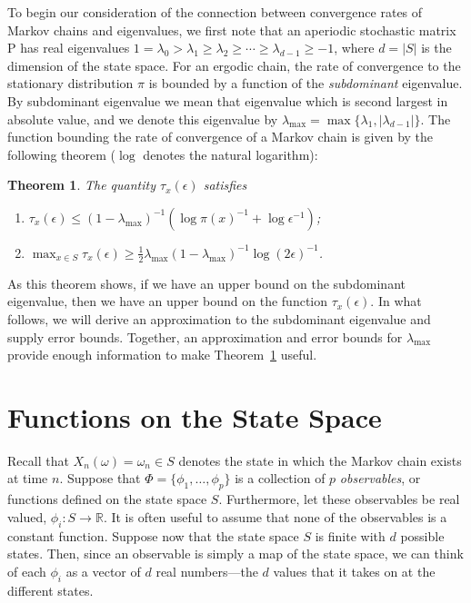 \documentclass[12pt,letterpaper]{report}
\theoremstyle{plain}
\newtheorem{theorem}{Theorem}[chapter]
\theoremstyle{definition}
\theoremstyle{remark}
\numberwithin{theorem}{chapter}
\numberwithin{claim}{chapter}
\numberwithin{equation}{chapter}
\numberwithin{conjecture}{chapter}
\newcommand\R{\ensuremath{\mathbb{R}}}
\renewcommand\P{\ensuremath{\mathrm{P}}}
\newcommand\<{\ensuremath{\langle}}
\renewcommand\>{\ensuremath{\rangle}}
\begin{document}
To begin our consideration of the connection between convergence rates of Markov
chains and eigenvalues, we first note that an aperiodic stochastic matrix $\P$ has real
eigenvalues 
$1 = \lambda_0 > \lambda_1 \geq \lambda_2 \geq \cdots \geq \lambda_{d-1} \geq -1$, 
where $d = |S|$ is the dimension of the state space. For an ergodic chain, the
rate of convergence to the stationary distribution $\pi$ is bounded by a
function of the \emph{subdominant} eigenvalue. By subdominant eigenvalue we mean that
eigenvalue which is second largest in absolute value, and we denote this
eigenvalue by $\lambda_{\max} = \max\{\lambda_1, |\lambda_{d-1}|\}$. 
The function bounding the rate of convergence of a Markov chain is given by the
following theorem ($\log$ denotes the natural logarithm):
\begin{theorem}
\label{thm-2.1.2}
The quantity $\tau_x(\epsilon)$ satisfies
\begin{enumerate}
\item 
$\tau_x(\epsilon) \leq (1-\lambda_{\max})^{-1}(\log \pi(x)^{-1} + \log \epsilon^{-1})$;
\item $\max_{x \in S} \tau_x(\epsilon) \geq \frac{1}{2} \lambda_{\max}(1-\lambda_{\max})^{-1} \log(2\epsilon)^{-1}$.
\end{enumerate}
\end{theorem}
As this theorem shows, if we have an upper bound on the subdominant eigenvalue, then we have
an upper bound on the function $\tau_x(\epsilon)$. In what follows, we will
derive an approximation to the 
subdominant eigenvalue and supply error bounds. Together, an approximation and error bounds
for $\lambda_{\max}$  provide enough information to make Theorem~\ref{thm-2.1.2} useful.

\section{Functions on the State Space}
\label{sec:funct-state-space}
Recall that $X_n(\omega) = \omega_n\in S$ denotes the state in which the Markov
chain exists at time $n$. 
Suppose that 
$\Phi = \{\phi_1, \dots, \phi_p\}$ 
is a collection of $p$ \emph{observables}, or functions defined on the state
space $S$. Furthermore, let these observables be real valued, 
$\phi_i : S \rightarrow \R$. 
It is often useful to assume that none of the observables is a constant function. Suppose now that
the state space $S$ is finite with $d$ possible states. Then, since an
observable is simply a map of the state space, we can think of each $\phi_i$ as a
vector of $d$ real numbers---the $d$ values that it takes on at the different states.
\end{document}
